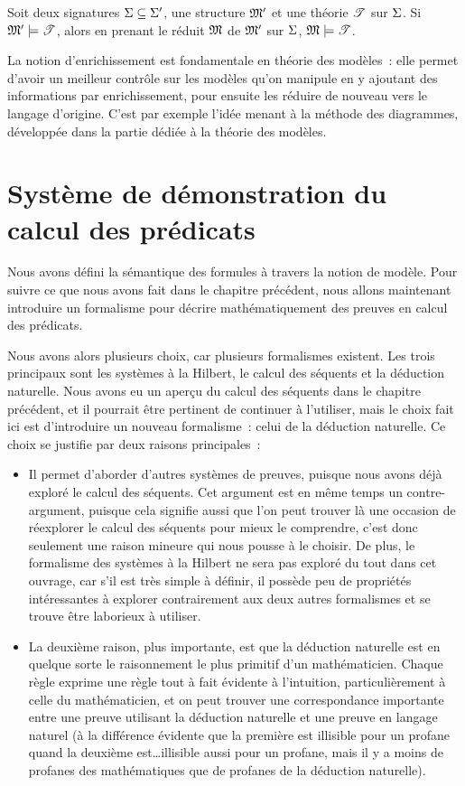 \begin{corollary}
  Soit deux signatures $\Sigma\subseteq\Sigma'$, une structure $\mathfrak{M}'$
  et une théorie $\mathscr T$ sur $\Sigma$. Si $\mathfrak{M}'\models \mathscr T$,
  alors en prenant le réduit $\mathfrak{M}$ de $\mathfrak{M}'$ sur $\Sigma$,
  $\mathfrak{M}\models \mathscr T$.
\end{corollary}

La notion d'enrichissement est fondamentale en théorie des modèles~: elle
permet d'avoir un meilleur contrôle sur les modèles qu'on manipule en y ajoutant
des informations par enrichissement, pour ensuite les réduire de nouveau vers
le langage d'origine. C'est par exemple l'idée menant à la méthode des
diagrammes, développée dans la partie dédiée à la théorie des modèles.

\section[Syntaxe de preuves]{Système de démonstration du calcul des prédicats}
\label{sec.syntaxe.preuve}

Nous avons défini la sémantique des formules à travers la notion de modèle. Pour
suivre ce que nous avons fait dans le chapitre précédent, nous allons maintenant
introduire un formalisme pour décrire mathématiquement des preuves en calcul des
prédicats.

Nous avons alors plusieurs choix, car plusieurs formalismes existent. Les trois
principaux sont les systèmes à la Hilbert, le calcul des séquents et la
déduction naturelle. Nous avons eu un aperçu du calcul des séquents dans le
chapitre précédent, et il pourrait être pertinent de continuer à l'utiliser,
mais le choix fait ici est d'introduire un nouveau formalisme~: celui de la
déduction naturelle. Ce choix se justifie par deux raisons principales~:
\begin{itemize}
\item Il permet d'aborder d'autres systèmes de preuves, puisque
  nous avons déjà exploré le calcul des séquents. Cet argument est en même temps
  un contre-argument, puisque cela signifie aussi que l'on peut trouver là une
  occasion de réexplorer le calcul des séquents pour mieux le comprendre, c'est
  donc seulement une raison mineure qui nous pousse à le choisir. De plus, le
  formalisme des systèmes à la Hilbert ne sera pas exploré du tout dans cet
  ouvrage, car s'il est très simple à définir, il possède peu de propriétés
  intéressantes à explorer contrairement aux deux autres formalismes et se
  trouve être laborieux à utiliser.
\item La deuxième raison, plus importante, est que la déduction naturelle est en
  quelque sorte le raisonnement le plus primitif d'un mathématicien. Chaque
  règle exprime une règle tout à fait évidente à l'intuition, particulièrement à
  celle du mathématicien, et on peut trouver une correspondance importante
  entre une preuve utilisant la déduction naturelle et une preuve en langage
  naturel (à la différence évidente que la première est illisible pour un
  profane quand la deuxième est\ldots illisible aussi pour un profane, mais il y
  a moins de profanes des mathématiques que de profanes de la déduction
  naturelle).
\end{itemize}


